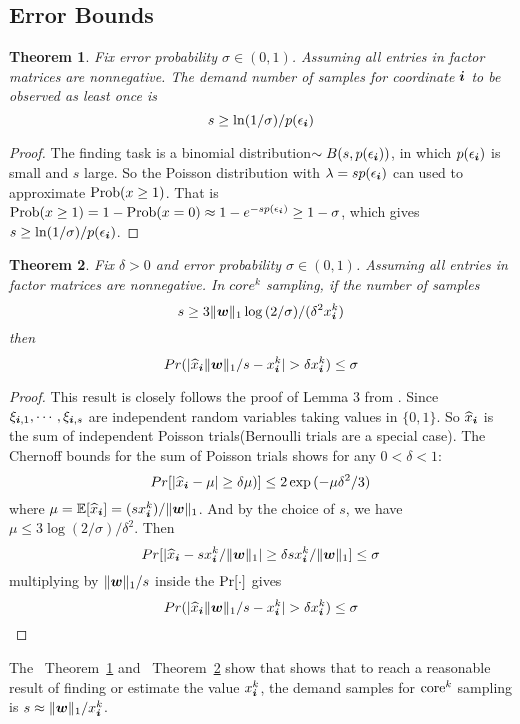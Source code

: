 \documentclass[letterpaper]{article}
\newcommand{\score}[1]{\xi_{\V{i},#1}}
\newcommand{\V}[1]{{\boldsymbol{{\MakeLowercase{#1}}}}}
\newcommand{\norm}[2]{\|#1\|_{#2}}
\newcommand{\Lem}[1]  {Lemma~\ref{lem:#1}}
\newcommand{\Theo}[1] {Theorem~\ref{theo:#1}}
\newcommand{\predx}{\widehat{x}_{\V{i}}}
\newtheorem{theorem}{Theorem}
\begin{document}
\subsection{Error Bounds}
\begin{theorem}\label{theo:ObservationBound}
Fix error probability $\sigma \in (0,1)$.
Assuming all entries in factor matrices are nonnegative.
The demand number of samples for coordinate $\V{i}$ to be observed as least once is
\[
    s \geq \ln(1/\sigma)/p(\epsilon_{\V{i}})
\]
\end{theorem}
\begin{proof}
The finding task is a binomial distribution$\sim B(s,p(\epsilon_{\V{i}}))$,
in which $p(\epsilon_{\V{i}})$ is small and $s$ large.
So the Poisson distribution with $\lambda = sp(\epsilon_{\V{i}})$
can used to approximate ${\rm Prob}(x\geq1)$.
That is ${\rm Prob}(x\geq1) = 1-{\rm Prob}(x=0)\approx 1-e^{-sp(\epsilon_{\V{i}})} \geq 1-\sigma$,
which gives $s \geq \ln(1/\sigma)/p(\epsilon_{\V{i}})$.
\end{proof}
\begin{theorem}\label{theo:Bound}
Fix $\delta > 0$ and error probability $\sigma \in (0,1)$.
Assuming all entries in factor matrices are nonnegative.
In $core^k$ sampling, if the number of samples
\[
    s \geq 3\norm{\V{w}}{1}\log{(2/\sigma)}/(\delta^2 x^k_{\V{i}})
\]
then
\[
    Pr(|\predx\norm{\V{W}}{1}/s - x^k_{\V{i}}| > \delta x^k_{\V{i}}) \leq \sigma
\]
\end{theorem}

\begin{proof}
This result is closely follows the proof of Lemma 3 from \cite{BaPiKoSe15}.
Since  $ \score{1},\cdots,\score{s} $
are independent random variables taking values in $\{0,1\}$.
So $\predx$ is the sum of independent Poisson trials(Bernoulli trials are a special case).
The Chernoff bounds for the sum of Poisson trials shows for any $0 <\delta <1 $:
\[
    Pr[|\predx - \mu|\geq\delta\mu)] \leq 2\exp{(-\mu\delta^2/3)}
\]
where $\mu=\mathbb{E}[\predx]=(sx^k_{\V{i}})/\norm{\V{W}}{1}$.
And by the choice of $s$, we have
$\mu\leq 3\log{(2/\sigma)/\delta^2}$.
Then
\[
    Pr[|\predx-sx^k_{\V{i}}/\norm{\V{W}}{1}|\geq\delta sx^k_{\V{i}}/\norm{\V{W}}{1}] \leq \sigma
\]
multiplying by $\norm{\V{W}}{1}/s$ inside the ${\rm Pr}[\cdot]$ gives
\[
    Pr(|\predx\norm{\V{W}}{1}/s - x^k_{\V{i}}| > \delta x^k_{\V{i}}) \leq \sigma
\]
\end{proof}
The ~\Theo{ObservationBound} and ~\Theo{Bound} show that shows that
to reach a reasonable result of finding or estimate the value $x^k_{\V{i}}$,
the demand samples for ${\rm core}^k$ sampling is $s\approx \norm{\V{w}}{1}/x_{\V{i}}^k$.
\end{document}
